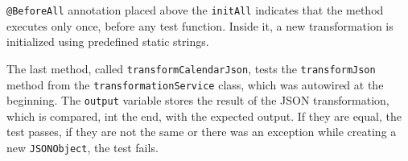 \texttt{@BeforeAll} annotation placed above the \texttt{initAll} indicates that the method executes only once, before any test function. Inside it, a new transformation is initialized using predefined static strings.

The last method, called \texttt{transformCalendarJson}, tests the \texttt{transformJson} method from the \texttt{transformationService} class, which was autowired at the beginning. The \texttt{output} variable stores the result of the JSON transformation, which is compared, int the end, with the expected output. If they are equal, the test passes, if they are not the same or there was an exception while creating a new \texttt{JSONObject}, the test fails.


